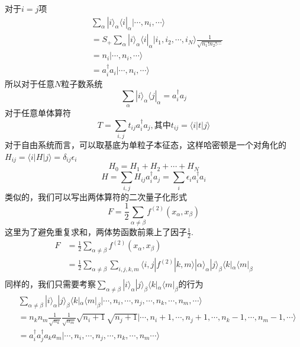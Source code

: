 \documentclass[12pt]{article}
\begin{document}
对于$i=j$项
\begin{equation*}
    \begin{split}
        &\sum_{\alpha}|i\rangle_\alpha\langle i|_\alpha|\cdots,n_i,\cdots\rangle\\
        &=S_+\sum_\alpha|i\rangle_\alpha\langle i|_\alpha|i_1,i_2,\cdots,i_N\rangle\frac{1}{\sqrt{n_1!n_2!\cdots}}\\
        &=n_i|\cdots,n_i,\cdots\rangle\\
        &=a_i^\dagger a_i|\cdots,n_i,\cdots\rangle
    \end{split}
\end{equation*}
所以对于任意$N$粒子数系统
\begin{equation*}
    \sum_\alpha|i\rangle_\alpha\langle j|_\alpha=a_i^\dagger a_j
\end{equation*}
对于任意单体算符
\begin{equation*}
    T=\sum_{i,j}t_{ij}a_i^\dagger a_j,\text{其中}t_{ij}=\langle i|t|j\rangle
\end{equation*}
对于自由系统而言，可以取基底为单粒子本征态，这样哈密顿是一个对角化的$H_{ij}=\langle i|H|j\rangle=\delta_{ij}\epsilon_i$
\begin{equation*}
    H_0=H_1+H_2+\cdots+H_N
\end{equation*}
\begin{equation*}
    H=\sum_{i,j}H_{ij}a_i^\dagger a_j=\sum_{i}\epsilon_{i}a_i^\dagger a_i
\end{equation*}
类似的，我们可以写出两体算符的二次量子化形式
\begin{equation*}
    F=\frac{1}{2}\sum_{\alpha\neq\beta}f^{(2)}(x_\alpha,x_\beta)
\end{equation*}
这里为了避免重复求和，两体势函数前乘上了因子$\frac{1}{2}$.
\begin{equation*}
    \begin{split}
        F&=\frac{1}{2}\sum_{\alpha\neq\beta}f^{(2)}(x_\alpha,x_\beta)\\
        &=\frac{1}{2}\sum_{\alpha\neq\beta}\sum_{i,j,k,m}\langle i,j|f^{(2)}|k,m\rangle|\alpha\rangle_\alpha|j\rangle_\beta\langle k|_\alpha\langle m|_\beta\\
    \end{split}
\end{equation*}
同样的，我们只需要考察$\sum_{\alpha\neq\beta}|i\rangle_\alpha|j\rangle_\beta\langle k|_\alpha\langle m|_\beta$的行为
\begin{equation*}
    \begin{split}
        &\sum_{\alpha\neq\beta}|i\rangle_\alpha|j\rangle_\beta\langle k|_\alpha\langle m|_\beta|\cdots,n_i,\cdots,n_j,\cdots,n_k,\cdots,n_m,\cdots\rangle\\
        &=n_kn_m\frac{1}{\sqrt{n_k}}\frac{1}{\sqrt{n_m}}\sqrt{n_i+1}\sqrt{n_j+1}|\cdots,n_i+1,\cdots,n_j+1,\cdots,n_k-1,\cdots,n_m-1,\cdots\rangle\\
        &=a_i^\dagger a_j^\dagger a_k a_m|\cdots,n_i,\cdots,n_j,\cdots,n_k,\cdots,n_m\cdots\rangle
    \end{split}
\end{equation*}
\end{document}
